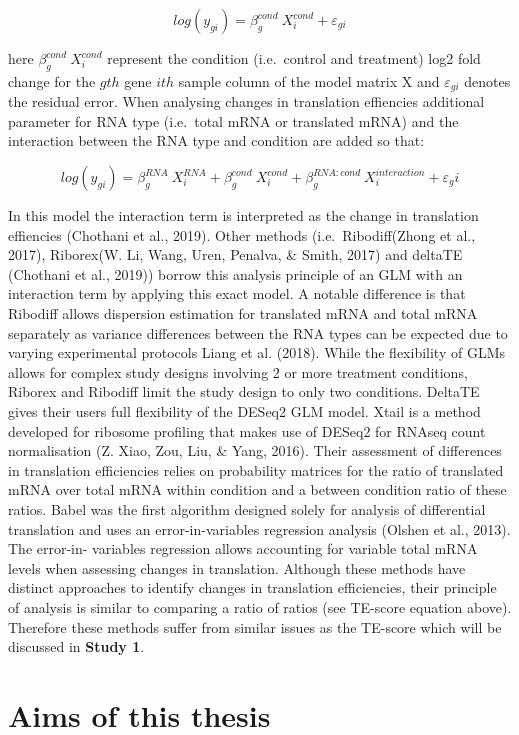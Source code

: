 \documentclass[
  12pt,
  openany]{book}
\begin{document}
\[log(y_{gi}) = \beta_g^{cond}\ X_i^{cond} + \varepsilon_{gi}\]

here \(\beta_g^{cond}\ X_i^{cond}\) represent the condition (i.e.~control and treatment) log2 fold change for the \(gth\) gene \(ith\) sample column of the model matrix X and \(\varepsilon_{gi}\) denotes the residual error. When analysing changes in translation effiencies additional parameter for RNA type (i.e.~total mRNA or translated mRNA) and the interaction between the RNA type and condition are added so that:

\[log(y_{gi}) = \beta_g^{RNA}\ X_i^{RNA}+ \beta_g^{cond}\ X_i^{cond} + \beta_g^{RNA:cond}\ X_i^{interaction} + \varepsilon_gi\]

In this model the interaction term is interpreted as the change in translation effiencies (Chothani et al., 2019). Other methods (i.e.~Ribodiff(Zhong et al., 2017), Riborex(W. Li, Wang, Uren, Penalva, \& Smith, 2017) and deltaTE (Chothani et al., 2019)) borrow this analysis principle of an GLM with an interaction term by applying this exact model. A notable difference is that Ribodiff allows dispersion estimation for translated mRNA and total mRNA separately as variance differences between the RNA types can be expected due to varying experimental protocols Liang et al. (2018). While the flexibility of GLMs allows for complex study designs involving 2 or more treatment conditions, Riborex and Ribodiff limit the study design to only two conditions. DeltaTE gives their users full flexibility of the DESeq2 GLM model. Xtail is a method developed for ribosome profiling that makes use of DESeq2 for RNAseq count normalisation (Z. Xiao, Zou, Liu, \& Yang, 2016). Their assessment of differences in translation efficiencies relies on probability matrices for the ratio of translated mRNA over total mRNA within condition and a between condition ratio of these ratios. Babel was the first algorithm designed solely for analysis of differential translation and uses an error-in-variables regression analysis (Olshen et al., 2013). The error-in- variables regression allows accounting for variable total mRNA levels when assessing changes in translation. Although these methods have distinct approaches to identify changes in translation efficiencies, their principle of analysis is similar to comparing a ratio of ratios (see TE-score equation above). Therefore these methods suffer from similar issues as the TE-score which will be discussed in \textbf{Study 1}.

\chapter{Aims of this thesis}
\end{document}
